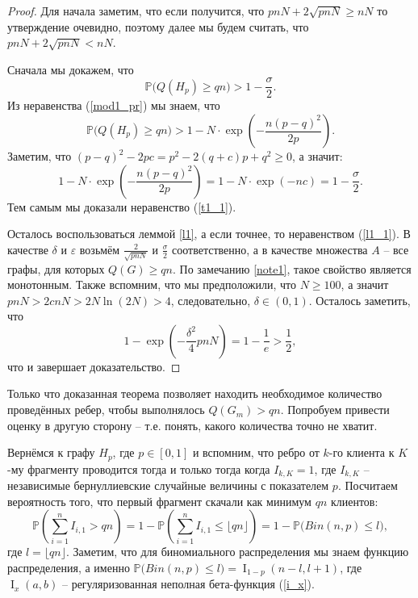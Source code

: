 \documentclass{matmex-diploma-custom}
\newcommand{\PRob}{\mathbb P}
\newcommand{\leqs}{\leqslant}
\newcommand{\geqs}{\geqslant}
\newcommand{\eps}{\varepsilon}
\DeclareMathOperator{\I}{I}
\theoremstyle{named}
\begin{document}
\begin{proof}
Для начала заметим, что если получится, что $pnN + 2\sqrt{pnN} \geqs nN$ то утверждение очевидно, 
поэтому далее мы будем считать, что $pnN + 2\sqrt{pnN} < nN$.

Сначала мы докажем, что 
\begin{equation}\label{t1_1}
\PRob\big(Q(H_p) \geqs qn \big) > 1 - \frac\sigma{2}.
\end{equation}
Из неравенства (\ref{mod1_pr}) мы знаем, что 
\begin{equation} \label{t1_t3_1}
\PRob\big(Q(H_p) \geqs qn \big) > 1 - N \cdot \exp\left(- \frac{n (p-q)^2}{2p} \right).
\end{equation}
Заметим, что $(p-q)^2 - 2pc = p^2 -2(q + c)p + q^2 \geqs 0$, а значит:
\begin{equation}
1 - N \cdot \exp\left(- \frac{n (p-q)^2}{2p} \right) = 1 - N \cdot \exp(-nc) = 1 - \frac\sigma{2}.
\end{equation}
Тем самым мы доказали неравенство (\ref{t1_1}).

Осталось воспользоваться леммой \ref{l1}, а если точнее, то неравенством (\ref{l1_1}). 
В качестве $\delta$ и $\eps$ возьмём $\frac{2}{\sqrt{pnN}}$ и $\frac\sigma{2}$ соответственно, 
а в качестве множества $A$ -- все графы, для которых $Q(G) \geqs qn$.
По замечанию \ref{note1}, такое свойство является монотонным.
Также вспомним, что мы предположили, что $N \geqs 100$, а значит $pnN > 2cnN> 2N\ln(2N) > 4$, 
следовательно, $\delta \in (0,1)$. 
Осталось заметить, что 
\begin{equation}
1 - \exp\left(-\frac{\delta^2}{4}pnN\right) = 1 - \frac{1}{e} > \frac{1}{2},
\end{equation}
что и завершает доказательство.
\end{proof}

\bigskip

Только что доказанная теорема позволяет находить необходимое количество проведённых ребер, чтобы выполнялось $Q(G_m) > qn$.
Попробуем привести оценку в другую сторону -- т.е. понять, какого количества точно не хватит.

Вернёмся к графу $H_p$, где $p \in [0,1]$ и вспомним, что ребро от $k$-го клиента к $K$-му фрагменту проводится тогда и только тогда
когда $I_{k,K} = 1$, где $I_{k,K}$ -- независимые бернуллиевские случайные величины с показателем $p$. 
Посчитаем вероятность того, что первый фрагмент скачали как минимум $qn$ клиентов:
\begin{equation}
\PRob\left(\sum_{i=1}^n I_{i,1} > qn\right) 
	= 
1 - \PRob\left(\sum_{i=1}^n I_{i,1} \leqs \lfloor qn \rfloor\right) 
	= 
1 - \PRob\big(Bin(n, p) \leqs l\big),
\end{equation}
где $l = \lfloor qn \rfloor$. Заметим, что для биномиального распределения мы знаем функцию распределения, 
а именно $\PRob\big(Bin(n, p) \leqs l\big) = \I_{1-p}(n-l, l+1)$, где $\I_x(a,b)$ -- регуляризованная неполная бета-функция (\ref{i_x}).
\end{document}
